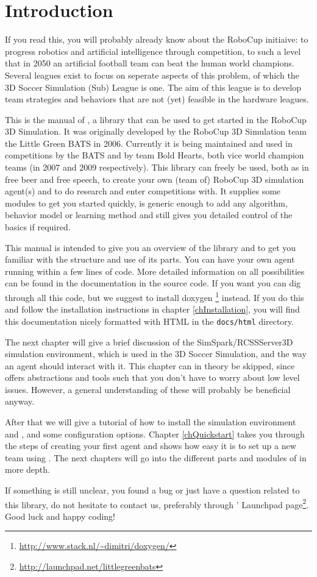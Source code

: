 \chapter{Introduction}

If you read this, you will probably already know about the RoboCup initiaive: to progress robotics and artificial intelligence through competition, to such a level that in 2050 an artificial football team can beat the human world champions. Several leagues exist to focus on seperate aspects of this problem, of which the 3D Soccer Simulation (Sub) League is one. The aim of this league is to develop team strategies and behaviors that are not (yet) feasible in the hardware leagues.

This is the manual of \libbats, a library that can be used to get started in the RoboCup 3D Simulation. It was originally developed by the RoboCup 3D Simulation team the Little Green BATS in 2006. Currently it is being maintained and used in competitions by the BATS and by team Bold Hearts, both vice world champion teams (in 2007 and 2009 respectively). This library can freely be used, both as in free beer and free speech, to create your own (team of) RoboCup 3D simulation agent(s) and to do research and enter competitions with. It supplies some modules to get you started quickly, is generic enough to add any algorithm, behavior model or learning method and still gives you detailed control of the basics if required.

This manual is intended to give you an overview of the library and to get you familiar with the structure and use of its parts. You can have your own agent running within a few lines of code. More detailed information on all possibilities can be found in the documentation in the source code. If you want you can dig through all this code, but we suggest to install doxygen \footnote{\url{http://www.stack.nl/~dimitri/doxygen/}} instead. If you do this and follow the installation instructions in chapter \ref{chInstallation}, you will find this documentation nicely formatted with HTML in the {\tt docs/html} directory.

The next chapter will give a brief discussion of the SimSpark/RCSSServer3D simulation environment, which is used in the 3D Soccer Simulation, and the way an agent should interact with it. This chapter can in theory be skipped, since \libbats offers abstractions and tools such that you don't have to worry about low level issues. However, a general understanding of these will probably be beneficial anyway.

After that we will give a tutorial of how to install the simulation environment and \libbats, and some configuration options. Chapter \ref{chQuickstart} takes you through the steps of creating your first agent and shows how easy it is to set up a new team using \libbats. The next chapters will go into the different parts and modules of \libbats in more depth.

If something is still unclear, you found a bug or just have a question related to this library, do not hesitate to contact us, preferably through \libbats' Launchpad page\footnote{\url{http://launchpad.net/littlegreenbats}}. Good luck and happy coding!
